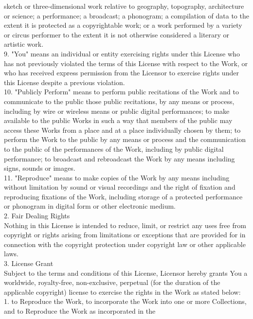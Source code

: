 {   sketch or three-dimensional work relative to geography, topography,
   architecture or science; a performance; a broadcast; a phonogram; a
   compilation of data to the extent it is protected as a
   copyrightable work; or a work performed by a variety or circus
   performer to the extent it is not otherwise considered a literary
   or artistic work.
\\[4pt]
   9. "You" means an individual or entity exercising rights under this
   License who has not previously violated the terms of this License
   with respect to the Work, or who has received express permission
   from the Licensor to exercise rights under this License despite a
   previous violation.
\\[4pt]
  10. "Publicly Perform" means to perform public recitations of the
  Work and to communicate to the public those public recitations, by
  any means or process, including by wire or wireless means or public
  digital performances; to make available to the public Works in such
  a way that members of the public may access these Works from a place
  and at a place individually chosen by them; to perform the Work to
  the public by any means or process and the communication to the
  public of the performances of the Work, including by public digital
  performance; to broadcast and rebroadcast the Work by any means
  including signs, sounds or images.
\\[4pt]
  11. "Reproduce" means to make copies of the Work by any means
  including without limitation by sound or visual recordings and the
  right of fixation and reproducing fixations of the Work, including
  storage of a protected performance or phonogram in digital form or
  other electronic medium.
\\[4pt]
2. Fair Dealing Rights
\\[4pt]
Nothing in this License is intended to reduce, limit, or restrict any
uses free from copyright or rights arising from limitations or
exceptions that are provided for in connection with the copyright
protection under copyright law or other applicable laws.
\\[4pt]
3. License Grant
\\[4pt]
Subject to the terms and conditions of this License, Licensor hereby
grants You a worldwide, royalty-free, non-exclusive, perpetual (for
the duration of the applicable copyright) license to exercise the
rights in the Work as stated below:
\\[4pt]
   1. to Reproduce the Work, to incorporate the Work into one or more
   Collections, and to Reproduce the Work as incorporated in the
}
